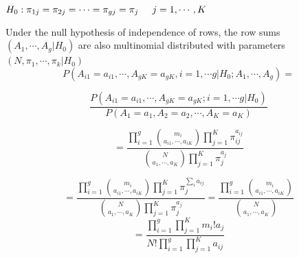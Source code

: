 \documentclass[12pt,oneside]{report}
\theoremstyle{definition}
\theoremstyle{mystyle}
\begin{document}
$H_{0}:\pi_{1j}=\pi_{2j}=\cdots=\pi_{gj}=\pi_{j} \hspace{3mm} \hspace{2mm}j=1,\cdots,K $ 

Under the null hypothesis of independence of rows, the row sums $(A_{1},\cdots,A_{g}|H_{0})$ are also multinomial distributed with parameters $(N,\pi_{1},\cdots,\pi_{k}|H_{0})$\\


\begin{equation*}
\displaystyle P(A_{i1}=a_{i1},\cdots,A_{gK}=a_{gK},i=1,\cdots g|H_{0};A_{1},\cdots,A_{g})=
\end{equation*}

\begin{equation*}
\displaystyle\frac{P(A_{i1}=a_{i1},\cdots,A_{gK}=a_{gK};i=1,\cdots g|H_{0})}{P(A_{1}=a_{1},A_{2}=a_{2},\cdots,A_{K}=a_{K})}
\end{equation*}


\begin{equation*}
=\displaystyle\frac{\prod \limits_{i=1}^{g}\binom{m_{i}}{a_{i1},\cdots,a_{iK}}\prod \limits_{j=1}^{K}\pi_{ij}^{a_{ij}}}{\binom{N}{a_{1},\cdots,a_{K}}\prod \limits_{j=1}^{K}\pi_{j}^{a_{j}}}
\end{equation*}


\begin{equation*}
=\displaystyle\frac{\prod \limits_{i=1}^{g}\binom{m_{i}}{a_{i1},\cdots,a_{iK}}\prod \limits_{j=1}^{K}\pi_{j}^{\sum\limits_{i}a_{ij}}}{\binom{N}{a_{1},\cdots,a_{K}}\prod \limits_{j=1}^{K}\pi_{j}^{a_{j}}}
=\displaystyle\frac{\prod \limits_{i=1}^{g}\binom{m_{i}}{a_{i1},\cdots,a_{iK}}}{\binom{N}{a_{1},\cdots,a_{K}}}
\end{equation*}
\begin{equation*}
=\displaystyle\frac{\prod \limits_{i=1}^{g}\prod \limits_{j=1}^{K}m_{i}!a_{j}}{N!\prod \limits_{i=1}^{g}\prod \limits_{j=1}^{K}a_{ij}}
\end{equation*}
\end{document}
